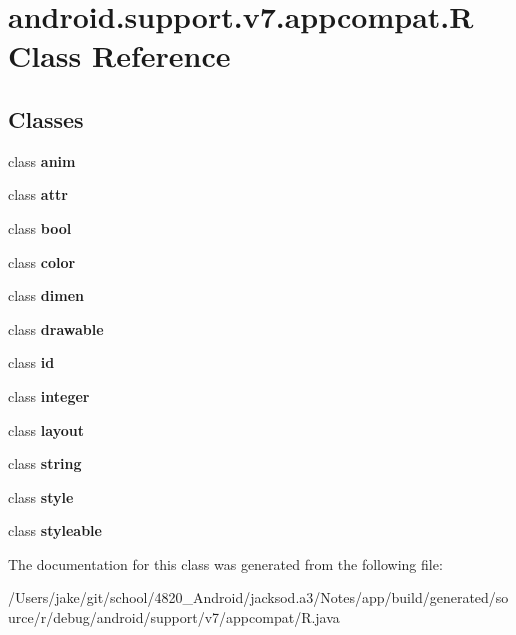 \hypertarget{classandroid_1_1support_1_1v7_1_1appcompat_1_1_r}{}\section{android.\+support.\+v7.\+appcompat.\+R Class Reference}
\label{classandroid_1_1support_1_1v7_1_1appcompat_1_1_r}
\subsection*{Classes}
\begin{DoxyCompactItemize}
\item 
class {\bfseries anim}
\item 
class {\bfseries attr}
\item 
class {\bfseries bool}
\item 
class {\bfseries color}
\item 
class {\bfseries dimen}
\item 
class {\bfseries drawable}
\item 
class {\bfseries id}
\item 
class {\bfseries integer}
\item 
class {\bfseries layout}
\item 
class {\bfseries string}
\item 
class {\bfseries style}
\item 
class {\bfseries styleable}
\end{DoxyCompactItemize}


The documentation for this class was generated from the following file\+:\begin{DoxyCompactItemize}
\item 
/\+Users/jake/git/school/4820\+\_\+\+Android/jacksod.\+a3/\+Notes/app/build/generated/source/r/debug/android/support/v7/appcompat/R.\+java\end{DoxyCompactItemize}
